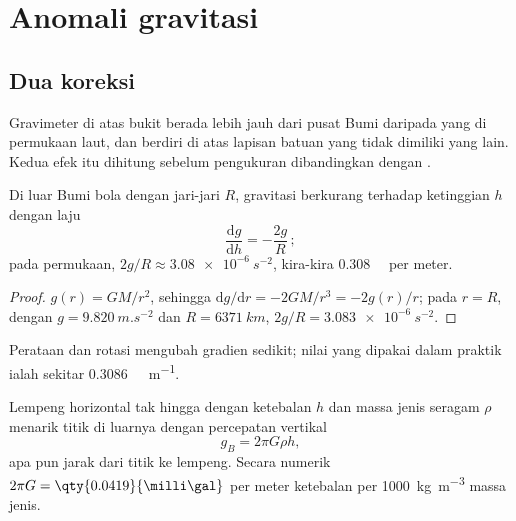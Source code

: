 \begin{omfigure}
\par{}
\label{fig:b1:isostasy-gravity:hypsometry}
\end{omfigure}

\section{Anomali gravitasi}

\subsection*{Dua koreksi}

Gravimeter di atas bukit berada lebih jauh dari pusat Bumi daripada yang di permukaan laut, dan berdiri di atas lapisan batuan yang tidak dimiliki yang lain. Kedua efek itu dihitung sebelum pengukuran dibandingkan dengan .

\begin{proposition}\label{prop:b1:isostasy-gravity:free-air}
Di luar Bumi bola dengan jari-jari $R$, gravitasi berkurang terhadap ketinggian $h$ dengan laju
\[
  \frac{\mathrm dg}{\mathrm dh} = -\frac{2g}{R}\,;
\]
pada permukaan, $2g/R \approx \qty{3.08e-6}{s^{-2}}$, kira-kira
\qty{0.308}{\milli\gal} per meter.
\end{proposition}

\begin{proof}
$g(r) = GM/r^2$, sehingga $\mathrm dg/\mathrm dr = -2GM/r^3 = -2g(r)/r$; pada $r = R$,
dengan $g = \qty{9.820}{m.s^{-2}}$ dan $R = \qty{6371}{km}$, $2g/R =
\qty{3.083e-6}{s^{-2}}$.
\end{proof}

Perataan dan rotasi mengubah gradien sedikit; nilai yang dipakai dalam praktik ialah sekitar \qty{0.3086}{\milli\gal.m^{-1}}.

\begin{proposition}\label{prop:b1:isostasy-gravity:slab}
Lempeng horizontal tak hingga dengan ketebalan $h$ dan massa jenis seragam $\rho$ menarik titik di luarnya dengan percepatan vertikal
\[
  g_B = 2\pi G\rho h ,
\]
apa pun jarak dari titik ke lempeng. Secara numerik $2\pi G =
\qty{0.0419}{\milli\gal}$ per meter ketebalan per \qty{1000}{kg.m^{-3}} massa jenis.
\end{proposition}

